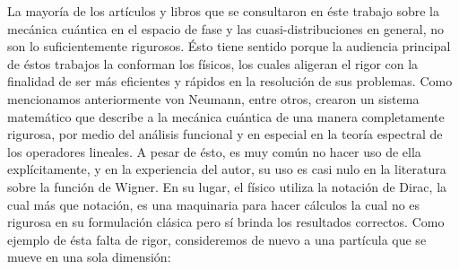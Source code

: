 \documentclass[a4paper]{report}
\begin{document}
  La mayoría de los artículos y libros que se consultaron en
  éste trabajo sobre la mecánica cuántica en el espacio de
  fase y las cuasi-distribuciones en general, no son lo
  suficientemente rigurosos. Ésto tiene sentido porque la
  audiencia principal de éstos trabajos la conforman los
  físicos, los cuales aligeran el rigor con la finalidad de
  ser más eficientes y rápidos en la resolución de sus
  problemas.  Como mencionamos anteriormente von Neumann,
  entre otros, crearon un sistema matemático que describe a
  la mecánica cuántica de una manera completamente rigurosa,
  por medio del análisis funcional y en especial en la
  teoría espectral de los operadores lineales.  A pesar de
  ésto, es muy común no hacer uso de ella explícitamente, y
  en la experiencia del autor, su uso es casi nulo en la
  literatura sobre la función de Wigner. En su lugar, el
  físico utiliza la notación de Dirac, la cual más que
  notación, es una maquinaria para hacer cálculos la cual no
  es rigurosa en su formulación clásica pero sí brinda los
  resultados correctos. Como ejemplo de ésta falta de rigor,
  consideremos de nuevo a una partícula que se mueve en una
  sola dimensión:
\end{document}
